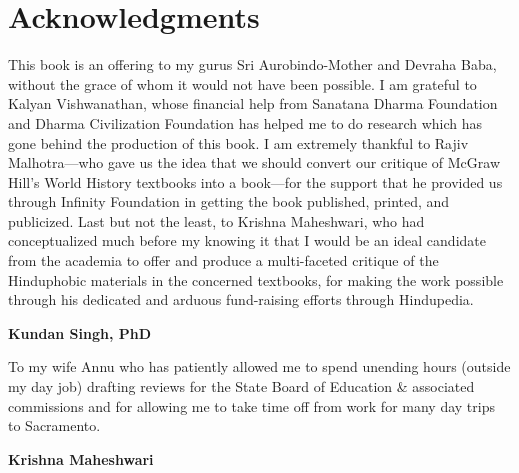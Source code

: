 \chapter*{Acknowledgments}

This book is an offering to my gurus Sri Aurobindo-Mother and Devraha Baba, without the grace of whom it would not have been possible. I am grateful to Kalyan Vishwanathan, whose financial help from Sanatana Dharma Foundation and Dharma Civilization Foundation has helped me to do research which has gone behind the production of this book. I am extremely thankful to Rajiv Malhotra—who gave us the idea that we should convert our critique of McGraw Hill’s World History textbooks into a book—for the support that he provided us through Infinity Foundation in getting the book published, printed, and publicized. Last but not the least, to Krishna Maheshwari, who had conceptualized much before my knowing it that I would be an ideal candidate from the academia to offer and produce a multi-faceted critique of the Hinduphobic materials in the concerned textbooks, for making the work possible through his dedicated and arduous fund-raising efforts through Hindupedia.

\begin{flushright}
\textbf{Kundan Singh, PhD}
\end{flushright}


To my wife Annu who has patiently allowed me to spend unending hours (outside my day job) drafting reviews for the State Board of Education \& associated commissions and for allowing me to take time off from work for many day trips to Sacramento.

\begin{flushright}
\textbf{Krishna Maheshwari}
\end{flushright}
